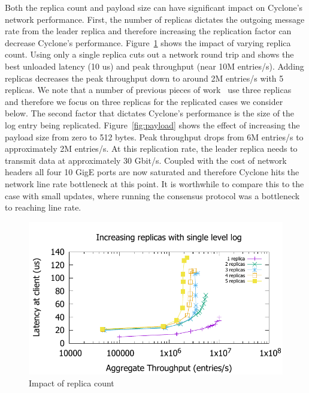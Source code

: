 \documentclass[pageno]{jpaper}
\begin{document}
Both the replica count and payload size can have significant impact on Cyclone's
network performance. First, the number of replicas dictates the outgoing message
rate from the leader replica and therefore increasing the replication factor can
decrease Cyclone's performance. Figure~\ref{fig:replicas} shows the impact of
varying replica count. Using only a single replica cuts out a network round trip
and shows the best unloaded latency (10 us) and peak throughput (near 10M
entries/s). Adding replicas decreases the peak throughput down to around 2M
entries/s with 5 replicas. We note that a number of previous pieces of
work~\cite{faast, farm} use three replicas and therefore we focus on three
replicas for the replicated cases we consider below. The second factor that
dictates Cyclone's performance is the size of the log entry being
replicated. Figure~\ref{fig:payload} shows the effect of increasing the payload
size from zero to 512 bytes. Peak throughput drops from 6M entries/s to
approximately 2M entries/s. At this replication rate, the leader replica needs
to transmit data at approximately 30 Gbit/s. Coupled with the cost of network
headers all four 10 GigE ports are now saturated and therefore Cyclone hits the
network line rate bottleneck at this point. It is worthwhile to compare this to
the case with small updates, where running the consensus protocol was a
bottleneck to reaching line rate.

\begin{figure}
\includegraphics[scale=0.6]{results2/replicas.pdf}
\caption{Impact of replica count}
\label{fig:replicas}
\end{figure}
\end{document}
